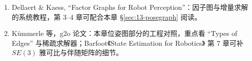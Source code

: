 \begin{reading}
\begin{enumerate}
  \item Dellaert \& Kaess, ``Factor Graphs for Robot Perception''\cite{dellaert2017factorgraphs}：因子图与增量求解的系统教程，第 3--4 章可配合本章 \S\ref{sec:13-posegraph} 阅读。
  \item Kümmerle 等，g2o 论文\cite{kummerle2011g2o}：本章位姿图部分的工程对照，重点看 ``Types of Edges'' 与稀疏求解器；Barfoot《State Estimation for Robotics》\cite{barfoot2017state} 第 7 章可补 $SE(3)$ 雅可比与伴随矩阵的细节。
\end{enumerate}


\end{reading}

